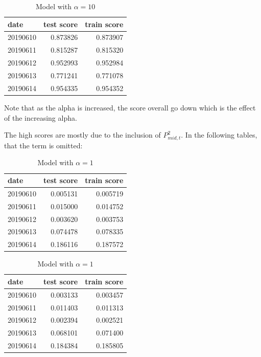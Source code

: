 \documentclass[english, 11pt, a4paper]{article}
\begin{document}
\begin{table}[H]
    \centering
    \begin{tabular}{lrr}
    \toprule
    date & test score & train score \\
    \midrule
    20190610 & 0.873826 & 0.873907 \\
    20190611 & 0.815287 & 0.815320 \\
    20190612 & 0.952993 & 0.952984 \\
    20190613 & 0.771241 & 0.771078 \\
    20190614 & 0.954335 & 0.954352 \\
    \bottomrule
    \end{tabular}
    \caption{Model with $\alpha = 10$}
\end{table}

Note that as the alpha is increased, the score overall go down which is the effect of the increasing
alpha.

The high scores are mostly due to the inclusion of  $P_{mid, t}^2$. In the following tables, that
the term is omitted:


\begin{table}[H]
  \centering
  \begin{minipage}{.4\textwidth}
    \centering
    \begin{tabular}{lrr}
    \toprule
    date & test score & train score \\
    \midrule
    20190610 & 0.005131 & 0.005719 \\
    20190611 & 0.015000 & 0.014752 \\
    20190612 & 0.003620 & 0.003753 \\
    20190613 & 0.074478 & 0.078335 \\
    20190614 & 0.186116 & 0.187572 \\
    \bottomrule
    \end{tabular}
    \caption{Model with $\alpha = 0.04$}
  \end{minipage}
  \hspace{1cm}
  \begin{minipage}{.4\textwidth}
    \centering
    \begin{tabular}{lrr}
    \toprule
    date & test score & train score \\
    \midrule
    20190610 & 0.003133 & 0.003457 \\
    20190611 & 0.011403 & 0.011313 \\
    20190612 & 0.002394 & 0.002521 \\
    20190613 & 0.068101 & 0.071400 \\
    20190614 & 0.184384 & 0.185805 \\
    \bottomrule
    \end{tabular}
    \caption{Model with $\alpha = 1$}
  \end{minipage}
\end{table}
\end{document}

